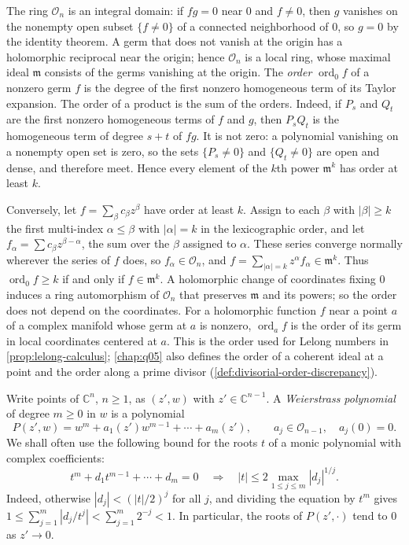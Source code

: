 The ring $\mathcal O_n$ is an integral domain: if $fg=0$ near $0$ and $f\neq0$, then $g$ vanishes on the nonempty open subset $\{f\neq0\}$ of a connected neighborhood of $0$, so $g=0$ by the identity theorem. A germ that does not vanish at the origin has a holomorphic reciprocal near the origin; hence $\mathcal O_n$ is a local ring, whose maximal ideal $\mathfrak m$ consists of the germs vanishing at the origin. The \emph{order} $\operatorname{ord}_0f$ of a nonzero germ $f$ is the degree of the first nonzero homogeneous term of its Taylor expansion. The order of a product is the sum of the orders. Indeed, if $P_s$ and $Q_t$ are the first nonzero homogeneous terms of $f$ and $g$, then $P_sQ_t$ is the homogeneous term of degree $s+t$ of $fg$. It is not zero: a polynomial vanishing on a nonempty open set is zero, so the sets $\{P_s\neq0\}$ and $\{Q_t\neq0\}$ are open and dense, and therefore meet. Hence every element of the $k$th power $\mathfrak m^k$ has order at least $k$.

Conversely, let $f=\sum_\beta c_\beta z^\beta$ have order at least $k$. Assign to each $\beta$ with $|\beta|\geq k$ the first multi-index $\alpha\leq\beta$ with $|\alpha|=k$ in the lexicographic order, and let $f_\alpha=\sum c_\beta z^{\beta-\alpha}$, the sum over the $\beta$ assigned to $\alpha$. These series converge normally wherever the series of $f$ does, so $f_\alpha\in\mathcal O_n$, and $f=\sum_{|\alpha|=k}z^\alpha f_\alpha\in\mathfrak m^k$. Thus $\operatorname{ord}_0f\geq k$ if and only if $f\in\mathfrak m^k$. A holomorphic change of coordinates fixing $0$ induces a ring automorphism of $\mathcal O_n$ that preserves $\mathfrak m$ and its powers; so the order does not depend on the coordinates. For a holomorphic function $f$ near a point $a$ of a complex manifold whose germ at $a$ is nonzero, $\operatorname{ord}_af$ is the order of its germ in local coordinates centered at $a$. This is the order used for Lelong numbers in \cref{prop:lelong-calculus}; \cref{chap:q05} also defines the order of a coherent ideal at a point and the order along a prime divisor (\cref{def:divisorial-order-discrepancy}).

Write points of $\mathbb C^n$, $n\geq1$, as $(z',w)$ with $z'\in\mathbb C^{n-1}$. A \emph{Weierstrass polynomial} of degree $m\geq0$ in $w$ is a polynomial
\[
 P(z',w)=w^m+a_1(z')w^{m-1}+\cdots+a_m(z'),\qquad a_j\in\mathcal O_{n-1},\quad a_j(0)=0.
\]
We shall often use the following bound for the roots $t$ of a monic polynomial with complex coefficients:
\begin{equation}\label{eq:monic-root-bound}
 t^m+d_1t^{m-1}+\cdots+d_m=0\quad\Longrightarrow\quad|t|\le2\max_{1\leq j\leq m}|d_j|^{1/j}.
\end{equation}
Indeed, otherwise $|d_j|<(|t|/2)^j$ for all $j$, and dividing the equation by $t^m$ gives $1\le\sum_{j=1}^m|d_j/t^j|<\sum_{j=1}^m2^{-j}<1$. In particular, the roots of $P(z',\cdot)$ tend to $0$ as $z'\to0$.

